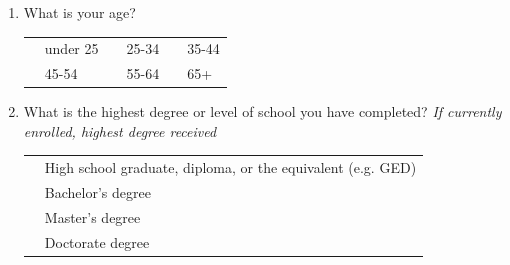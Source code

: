 \documentclass[letterpaper, 10 pt, conference]{ieeeconf}  %
\begin{document}
\begin{enumerate}
    \item What is your age?
        \begin{table}[!htbp]
        \begin{center}
        \begin{tabular}{|l|l|l|l|l|l}
        \cline{1-1} \cline{3-3} \cline{5-5}
         & under 25 &  & 25-34 &  & 35-44 \\ \cline{1-1} \cline{3-3} \cline{5-5}
         & 45-54    &  & 55-64 &  & 65+   \\ \cline{1-1} \cline{3-3} \cline{5-5}
        \end{tabular}
        \end{center}
        \end{table}
    \item What is the highest degree or level of school you have completed? \textit{If currently enrolled, highest degree received}
        \begin{table}[!htbp]
        \begin{center}
        \begin{tabular}{|l|l}
        \cline{1-1}
         & High school graduate, diploma, or the equivalent (e.g. GED) \\ \cline{1-1}
         & Bachelor's degree                                                   \\ \cline{1-1}
         & Master's degree                                                     \\ \cline{1-1}
         & Doctorate degree                                                    \\ \cline{1-1}
        \end{tabular}
        \end{center}
        \end{table}
\end{enumerate}








\end{document}
